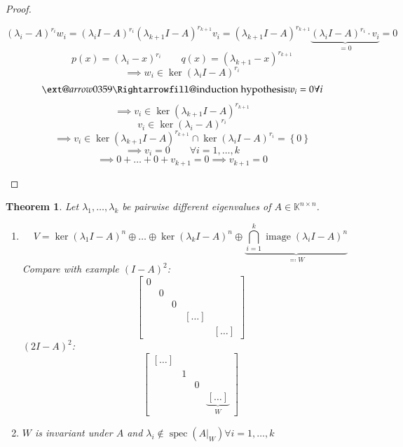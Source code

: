 \documentclass{article}
\makeatletter
\newtheorem{theorem}{Theorem}  \numberwithin{theorem}{section}
\newcommand{\set}[1]{\left\{#1\right\}}
\newcommand{\xRightarrow}[2][]{\ext@arrow 0359\Rightarrowfill@{#1}{#2}}
\DeclareMathOperator{\im}{image}
\makeatother
\begin{document}
\begin{proof}
\begin{description}
      \[ (\lambda_i - A)^{r_i} w_i = (\lambda_i I - A)^{r_i} (\lambda_{k+1} I - A)^{r_{k+1}} v_i = (\lambda_{k+1} I - A)^{r_{k+1}} \underbrace{(\lambda_i I - A)^{r_i} \cdot v_i}_{=0} = 0 \]
      \[ p(x) = (\lambda_i - x)^{r_i} \qquad q(x) = (\lambda_{k+1} - x)^{r_{k+1}} \]
      \[ \implies w_i \in \ker(\lambda_i I - A)^{r_i} \]
      \[ \xRightarrow{\text{induction hypothesis}} w_i = 0 \forall i \]
      \[ \implies v_i \in \ker(\lambda_{k+1} I - A)^{r_{k+1}} \]
      \[ v_i \in \ker(\lambda_i - A)^{r_i} \]
      \[ \implies v_i \in \ker(\lambda_{k+1} I - A)^{r_{k+1}} \cap \ker(\lambda_i I - A)^{r_i} = \set{0} \]
      \[ \implies v_i = 0 \qquad \forall i = 1, \dots, k \]
      \[ \implies 0 + \dots + 0 + v_{k+1} = 0 \implies v_{k+1} = 0 \]
  \end{description}
\end{proof}

\begin{theorem} %
  Let $\lambda_1, \dots, \lambda_k$ be pairwise different eigenvalues of $A \in \mathbb K^{n\times n}$.
  \begin{enumerate}
    \item \[
        V = \ker(\lambda_1 I - A)^{n} \oplus \dots \oplus \ker(\lambda_k I - A)^n \oplus \underbrace{\bigcap_{i=1}^k \im(\lambda_i I - A)^n}_{\eqqcolon W}
      \]
      Compare with example $(I - A)^2$:
      \[
        \begin{bmatrix}
          0 &   &   &         & \\
            & 0 &   &         & \\
            &   & 0 &         & \\
            &   &   & [\dots] & \\
            &   &   &         & [\dots]
        \end{bmatrix}
      \]
      $(2I - A)^2$:
      \[
        \begin{bmatrix}
          [\dots] &   &         & \\
            & 1 &         & \\
            &   & 0 & \\
            &   &         & \underbrace{[\dots]}_{W}
        \end{bmatrix}
      \]
    \item $W$ is invariant under $A$ and $\lambda_i \not\in \operatorname{spec}(A|_W) \forall i = 1, \dots, k$
  \end{enumerate}
\end{theorem}
\end{document}
